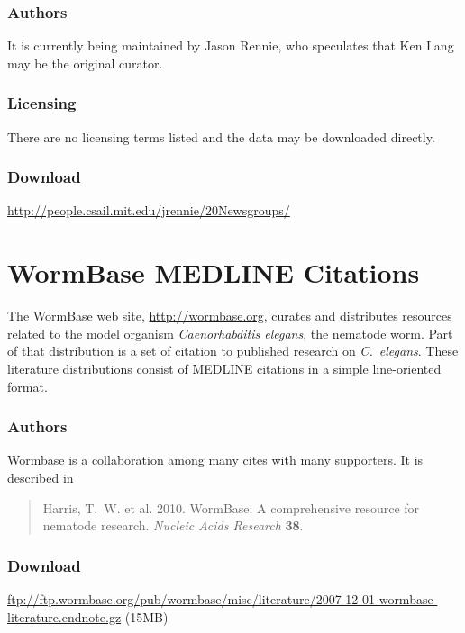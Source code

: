 \subsubsection{Authors}

It is currently being maintained by Jason Rennie, who speculates that
Ken Lang may be the original curator.

\subsubsection{Licensing}

There are no licensing terms listed and the data may be downloaded
directly.

\subsubsection{Download}

\url{http://people.csail.mit.edu/jrennie/20Newsgroups/}




\section{WormBase MEDLINE Citations}\label{section:corpora-wormbase}

The WormBase web site, \url{http://wormbase.org}, curates and distributes
resources related to the model organism {\it Caenorhabditis elegans},
the nematode worm.  Part of that distribution is a set of citation to
published research on {\it C.~elegans}.  These literature
distributions consist of MEDLINE citations in a simple line-oriented
format.

\subsubsection{Authors}

Wormbase is a collaboration among many cites with many supporters.
It is described in 
%
\begin{quote}
Harris, T.~W. et al. 2010. WormBase: A comprehensive resource for
nematode research. {\it Nucleic Acids Research} {\bf 38}.
\end{quote}

\subsubsection{Download}

\url{ftp://ftp.wormbase.org/pub/wormbase/misc/literature/2007-12-01-wormbase-literature.endnote.gz} (15MB)

